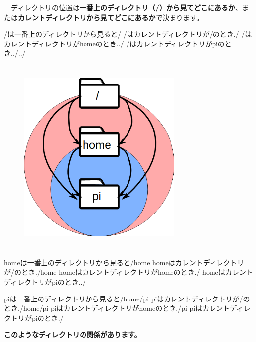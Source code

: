 \documentclass[a4paper,dvipdfmx]{jarticle}
\begin{document}
　ディレクトリの位置は\textbf{一番上のディレクトリ（/）から見てどこにあるか}、または\textbf{カレントディレクトリから見てどこにあるか}で決まります。


\bigskip

/は一番上のディレクトリから見ると/\newline
/はカレントディレクトリが/のとき./\newline
/はカレントディレクトリがhomeのとき../\newline
/はカレントディレクトリがpiのとき../../

\begin{figure}
\centering
\includegraphics[width=8.068cm,height=9.823cm]{text03-img/text03-img004.png}
\end{figure}
homeは一番上のディレクトリから見ると/home\newline
homeはカレントディレクトリが/のとき./home\newline
homeはカレントディレクトリがhomeのとき./\newline
homeはカレントディレクトリがpiのとき../

piは一番上のディレクトリから見ると/home/pi\newline
piはカレントディレクトリが/のとき./home/pi\newline
piはカレントディレクトリがhomeのとき./pi\newline
piはカレントディレクトリがpiのとき./


{\ttfamily\bfseries
このようなディレクトリの関係があります。}
\end{document}

